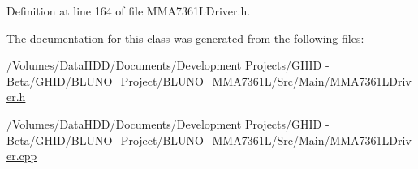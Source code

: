 \-Definition at line 164 of file \-M\-M\-A7361\-L\-Driver.\-h.



\-The documentation for this class was generated from the following files\-:\begin{DoxyCompactItemize}
\item 
/\-Volumes/\-Data\-H\-D\-D/\-Documents/\-Development Projects/\-G\-H\-I\-D -\/ Beta/\-G\-H\-I\-D/\-B\-L\-U\-N\-O\-\_\-\-Project/\-B\-L\-U\-N\-O\-\_\-\-M\-M\-A7361\-L/\-Src/\-Main/\hyperlink{_m_m_a7361_l_driver_8h}{\-M\-M\-A7361\-L\-Driver.\-h}\item 
/\-Volumes/\-Data\-H\-D\-D/\-Documents/\-Development Projects/\-G\-H\-I\-D -\/ Beta/\-G\-H\-I\-D/\-B\-L\-U\-N\-O\-\_\-\-Project/\-B\-L\-U\-N\-O\-\_\-\-M\-M\-A7361\-L/\-Src/\-Main/\hyperlink{_m_m_a7361_l_driver_8cpp}{\-M\-M\-A7361\-L\-Driver.\-cpp}\end{DoxyCompactItemize}
